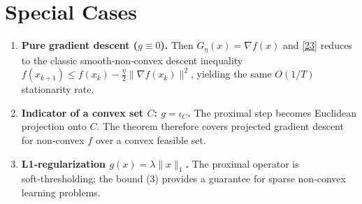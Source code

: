 \documentclass{article}
\newcommand{\grad}{\nabla}
\begin{document}
\section*{Special Cases}
\begin{enumerate}[noitemsep]
\item \textbf{Pure gradient descent ($g\equiv0$).} Then $G_{\eta}(x)=\grad f(x)$ and \eqref{23} reduces to the classic smooth‑non‑convex descent inequality $f(x_{k+1})\le f(x_{k})-\frac{\eta}{2}\|\grad f(x_{k})\|^{2}$, yielding the same $O(1/T)$ stationarity rate.
\item \textbf{Indicator of a convex set $C$: $g=\iota_{C}$.} The proximal step becomes Euclidean projection onto $C$. The theorem therefore covers projected gradient descent for non‑convex $f$ over a convex feasible set.
\item \textbf{L1‑regularization $g(x)=\lambda\|x\|_{1}$.} The proximal operator is soft‑thresholding; the bound (3) provides a guarantee for sparse non‑convex learning problems.
\end{enumerate}
\end{document}
